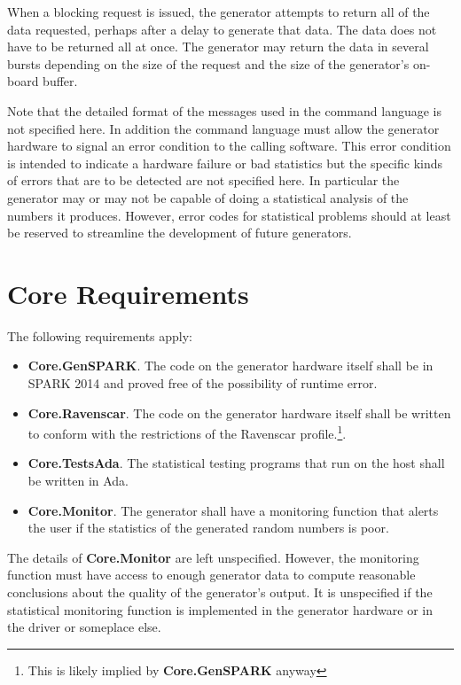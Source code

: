 When a blocking request is issued, the generator attempts to return all of the data requested,
perhaps after a delay to generate that data. The data does not have to be returned all at once.
The generator may return the data in several bursts depending on the size of the request and the
size of the generator's on-board buffer.

Note that the detailed format of the messages used in the command language is not specified
here. In addition the command language must allow the generator hardware to signal an error
condition to the calling software. This error condition is intended to indicate a hardware
failure or bad statistics but the specific kinds of errors that are to be detected are not
specified here. In particular the generator may or may not be capable of doing a statistical
analysis of the numbers it produces. However, error codes for statistical problems should at
least be reserved to streamline the development of future generators.

\section{Core Requirements}
\label{sec:core-requirements}

The following requirements apply:

\begin{itemize}
\item \textbf{Core.GenSPARK}. The code on the generator hardware itself shall be in SPARK 2014
  and proved free of the possibility of runtime error.
\item \textbf{Core.Ravenscar}. The code on the generator hardware itself shall be written to
  conform with the restrictions of the Ravenscar profile.\footnote{This is likely implied by
    \textbf{Core.GenSPARK} anyway}.
\item \textbf{Core.TestsAda}. The statistical testing programs that run on the host shall be
  written in Ada.
\item \textbf{Core.Monitor}. The generator shall have a monitoring function that alerts the user
  if the statistics of the generated random numbers is poor.
\end{itemize}

The details of \textbf{Core.Monitor} are left unspecified. However, the monitoring function must
have access to enough generator data to compute reasonable conclusions about the quality of the
generator's output. It is unspecified if the statistical monitoring function is implemented in
the generator hardware or in the driver or someplace else.

